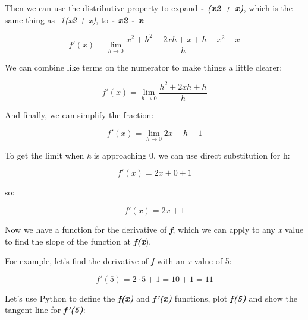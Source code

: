 \documentclass[11pt]{article}
\begin{document}
Then we can use the distributive property to expand \textbf{\emph{- (x2
+ x)}}, which is the same thing as \emph{-1(x2 + x)}, to \textbf{\emph{-
x2 - x}}:

\begin{equation}f'(x) = \lim_{h \to 0} \frac{x^{2} + h^{2} + 2xh + x + h - x^{2} - x}{h} \end{equation}

We can combine like terms on the numerator to make things a little
clearer:

\begin{equation}f'(x) = \lim_{h \to 0} \frac{h^{2} + 2xh + h}{h} \end{equation}

And finally, we can simplify the fraction:

\begin{equation}f'(x) = \lim_{h \to 0} 2x + h + 1 \end{equation}

To get the limit when \emph{h} is approaching 0, we can use direct
substitution for h:

\begin{equation}f'(x) = 2x + 0 + 1 \end{equation}

so:

\begin{equation}f'(x) = 2x + 1 \end{equation}

Now we have a function for the derivative of \textbf{\emph{f}}, which we
can apply to any \emph{x} value to find the slope of the function at
\textbf{\emph{f(x}}).

For example, let's find the derivative of \textbf{\emph{f}} with an
\emph{x} value of 5:

\begin{equation}f'(5) = 2\cdot5 + 1 = 10 + 1 = 11\end{equation}

Let's use Python to define the \textbf{\emph{f(x)}} and
\textbf{\emph{f'(x)}} functions, plot \textbf{\emph{f(5)}} and show the
tangent line for \textbf{\emph{f'(5)}}:
\end{document}
